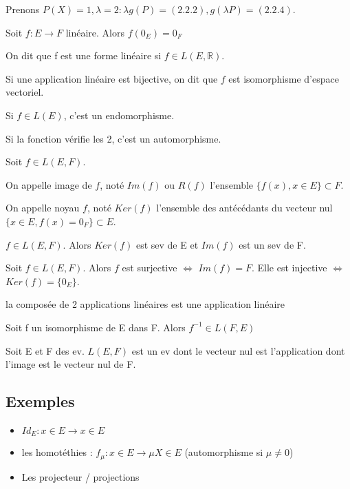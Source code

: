 \documentclass[french]{yLectureNote}
\newcommand{\R}[0]{\mathbb{R}}
\begin{document}
Prenons $P(X)=1,\lambda=2 : \lambda g(P) = (2.2.2), g(\lambda P) = (2.2.4)$.
\begin{proposition}
Soit \(f:E\to F\) linéaire. Alors \(f(0_E) = 0_F\)
\end{proposition}
\begin{definition}
On dit que f est une forme linéaire si \(f\in L(E,\R)\).

Si une application linéaire est bijective, on dit que \(f\) est isomorphisme d'espace vectoriel.

Si \(f\in L(E)\), c'est un endomorphisme.

Si la fonction vérifie les 2, c'est un automorphisme.
\end{definition}
\begin{definition}
Soit \(f\in L(E,F)\).

On appelle image de \(f\), noté \(Im(f)\) ou \(R(f)\) l'ensemble \(\{f(x),x\in E \}\subset F\).

On appelle noyau \(f\), noté \(Ker(f)\) l'ensemble des antécédants du vecteur nul \(\{x\in E, f(x)=0_F\}\subset E\).
\end{definition}
\begin{proposition}
\(f\in L(E,F)\). Alors \(Ker(f)\) est sev de E et \(Im(f)\) est un sev de F.
\end{proposition}
\begin{proposition}
Soit \(f\in L(E,F)\). Alors \(f\) est surjective \(\iff\) \(Im(f)=F\). Elle est injective \(\iff\) \(Ker(f) = \{0_E\}\).
\end{proposition}
\begin{proposition}
la composée de 2 applications linéaires est une application linéaire
\end{proposition}
\begin{proposition}
Soit f un isomorphisme de E dans F. Alors \(f^{-1} \in L(F,E)\)
\end{proposition}
\begin{proposition}
Soit E et F des ev. \(L(E,F)\) est un ev dont le vecteur nul est l'application dont l'image est le vecteur nul de F.
\end{proposition}
\subsection{Exemples}
\begin{itemize}
 \item \(Id_E : x\in E \to x\in E\)
 \item les homotéthies : \(f_{\mu} : x\in E \to \mu X\in E\) (automorphisme si \(\mu\neq 0\))
 \item Les projecteur / projections
\end{itemize}
\end{document}
